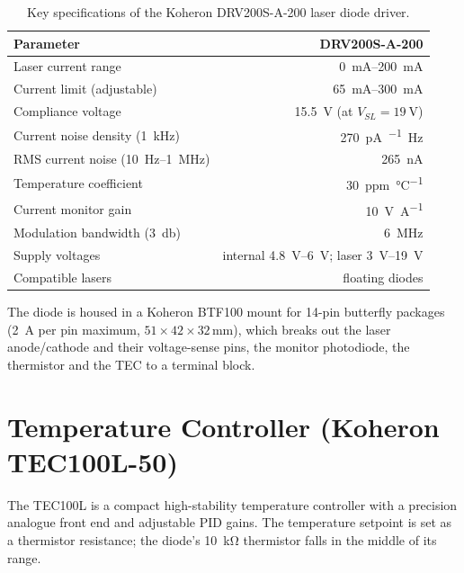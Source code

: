 \begin{table}[H]
	\centering
	\begin{tabular}{@{}lr@{}}
		\toprule
		\textbf{Parameter} & \textbf{DRV200S-A-200} \\
		\midrule
		Laser current range            & \SIrange{0}{200}{\milli\ampere} \\
		Current limit (adjustable)     & \SIrange{65}{300}{\milli\ampere} \\
		Compliance voltage             & \SI{15.5}{\volt} (at $V_{SL} = \SI{19}{\volt}$) \\
		Current noise density (\SI{1}{\kilo\hertz}) & \SI{270}{\pico\ampere\per\sqrt\hertz} \\
		RMS current noise (\SI{10}{\hertz}--\SI{1}{\mega\hertz}) & \SI{265}{\nano\ampere} \\
		Temperature coefficient        & \SI{30}{ppm\per\celsius} \\
		Current monitor gain           & \SI{10}{\volt\per\ampere} \\
		Modulation bandwidth (\SI{3}{\decibel}) & \SI{6}{\mega\hertz} \\
		Supply voltages                & internal \SIrange{4.8}{6}{\volt}; laser \SIrange{3}{19}{\volt} \\
		Compatible lasers              & floating diodes \\
		\bottomrule
	\end{tabular}
	\caption{Key specifications of the Koheron DRV200S-A-200 laser diode driver.}
	\label{tab:drv200s-full}
\end{table}

The diode is housed in a Koheron BTF100 mount for 14-pin butterfly packages (\SI{2}{\ampere} per pin maximum, $51 \times 42 \times 32$\,\si{\milli\metre}), which breaks out the laser anode/cathode and their voltage-sense pins, the monitor photodiode, the thermistor and the TEC to a terminal block.

\section{Temperature Controller (Koheron TEC100L-50)}
\label{appendix:tec}
The TEC100L is a compact high-stability temperature controller with a precision analogue front end and adjustable PID gains. The temperature setpoint is set as a thermistor resistance; the diode's \SI{10}{\kilo\ohm} thermistor falls in the middle of its range.


